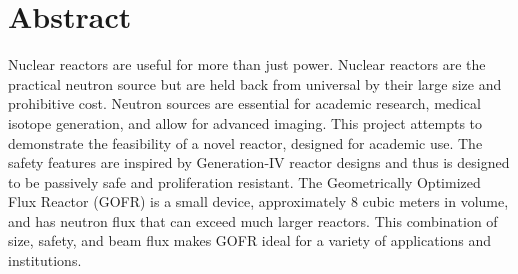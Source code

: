 \section*{Abstract}
\label{sec:abstract}
Nuclear reactors are useful for more than just power. Nuclear reactors are the practical neutron source but are held back from universal by their large size and prohibitive cost. Neutron sources are essential for academic research, medical isotope generation, and allow for advanced imaging. This project attempts to demonstrate the feasibility of a novel reactor, designed for academic use. The safety features are inspired by Generation-IV reactor designs and thus is designed to be passively safe and proliferation resistant. The Geometrically Optimized Flux Reactor (GOFR) is a small device, approximately 8 cubic meters in volume, and has neutron flux that can exceed much larger reactors. This combination of size, safety, and beam flux makes GOFR ideal for a variety of applications and institutions.